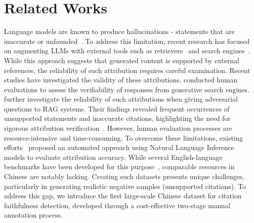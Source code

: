 \section{Related Works}
Language models are known to produce hallucinations - statements that are inaccurate or unfounded~\citep{MaynezNBM20,HuCLGWYG24}. To address this limitation, recent research has focused on augmenting LLMs with external tools such as retrievers~\citep{GuuLTPC20,BorgeaudMHCRM0L22,LiuCtrla2024} and search engines~\citep{WebGPT2021, Komeili0W22, TanGSXLFLWSLS24}. While this approach suggests that generated content is supported by external references, the reliability of such attribution requires careful examination. Recent studies have investigated the validity of these attributions. \citet{DBLP:conf/emnlp/LiuZL23} conducted human evaluations to assess the verifiability of responses from generative search engines. \citet{hu2024evaluate} further investigate the reliability of such attributions when giving adversarial questions to RAG systems. Their findings revealed frequent occurrences of unsupported statements and inaccurate citations, highlighting the need for rigorous attribution verification~\citep{RashkinNLA00PTT23}. However, human evaluation processes are resource-intensive and time-consuming. To overcome these limitations, existing efforts~\citep{GaoDPCCFZLLJG23,DBLP:conf/emnlp/GaoYYC23} proposed an automated approach using Natural Language Inference models to evaluate attribution accuracy. While several English-language benchmarks have been developed for this purpose~\citep{DBLP:conf/emnlp/YueWCZS023}, comparable resources in Chinese are notably lacking. Creating such datasets presents unique challenges, particularly in generating realistic negative samples (unsupported citations).  To address this gap, we introduce the first large-scale Chinese dataset for citation faithfulness detection, developed through a cost-effective two-stage manual annotation process.


